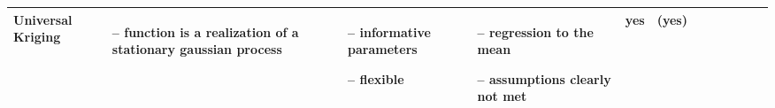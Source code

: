 \begin{table}[!ht]
\begin{tabular}{p{1.6cm}p{3.3cm}p{3.3cm}p{3.4cm}p{0.4cm}p{0.4cm}p{3cm}p{3cm}p{3cm}p{3cm}p{3cm}p{3cm}|}
		Universal Kriging                                                                                                                                            &
		\begin{cptitemize} \item[--]  function is a realization of a stationary gaussian process                                      \end{cptitemize}               &
		\begin{cptitemize} \item[--]  informative parameters \item[--]  flexible                                                             \end{cptitemize}        &
		\begin{cptitemize} \item[--]  regression to the mean \item[--]  assumptions clearly not met                                          \end{cptitemize}        &
		yes                                                                                                                                                          &
		(yes)                                                                                                                                                         \\ %

		\bottomrule
	\end{tabular}
	\label{table:pros_cons_overview}
\end{table}
